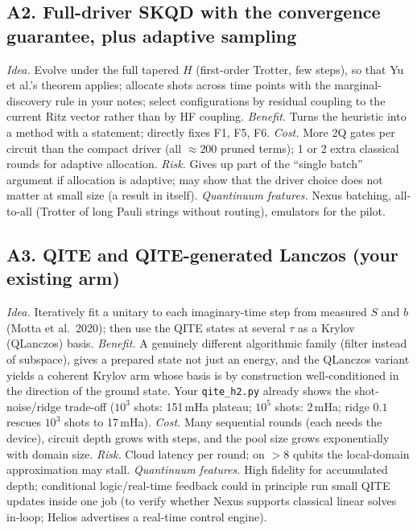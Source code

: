 \documentclass[11pt,a4paper]{article}
\begin{document}
\subsection*{A2. Full-driver SKQD with the convergence guarantee, plus adaptive sampling}
\emph{Idea.} Evolve under the full tapered $H$ (first-order Trotter, few steps), so that Yu et al.'s theorem applies; allocate shots across time points with the marginal-discovery rule in your notes; select configurations by residual coupling to the current Ritz vector rather than by HF coupling. \emph{Benefit.} Turns the heuristic into a method with a statement; directly fixes F1, F5, F6. \emph{Cost.} More 2Q gates per circuit than the compact driver (all $\approx200$ pruned terms); 1 or 2 extra classical rounds for adaptive allocation. \emph{Risk.} Gives up part of the ``single batch'' argument if allocation is adaptive; may show that the driver choice does not matter at small size (a result in itself). \emph{Quantinuum features.} Nexus batching, all-to-all (Trotter of long Pauli strings without routing), emulators for the pilot.

\subsection*{A3. QITE and QITE-generated Lanczos (your existing arm)}
\emph{Idea.} Iteratively fit a unitary to each imaginary-time step from measured $S$ and $b$ (Motta et al.\ 2020); then use the QITE states at several $\tau$ as a Krylov (QLanczos) basis. \emph{Benefit.} A genuinely different algorithmic family (filter instead of subspace), gives a prepared state not just an energy, and the QLanczos variant yields a coherent Krylov arm whose basis is by construction well-conditioned in the direction of the ground state. Your \texttt{qite\_h2.py} already shows the shot-noise/ridge trade-off ($10^3$ shots: 151\,mHa plateau; $10^5$ shots: 2\,mHa; ridge $0.1$ rescues $10^3$ shots to 17\,mHa). \emph{Cost.} Many sequential rounds (each needs the device), circuit depth grows with steps, and the pool size grows exponentially with domain size. \emph{Risk.} Cloud latency per round; on $>8$ qubits the local-domain approximation may stall. \emph{Quantinuum features.} High fidelity for accumulated depth; conditional logic/real-time feedback could in principle run small QITE updates inside one job (to verify whether Nexus supports classical linear solves in-loop; Helios advertises a real-time control engine).
\end{document}
